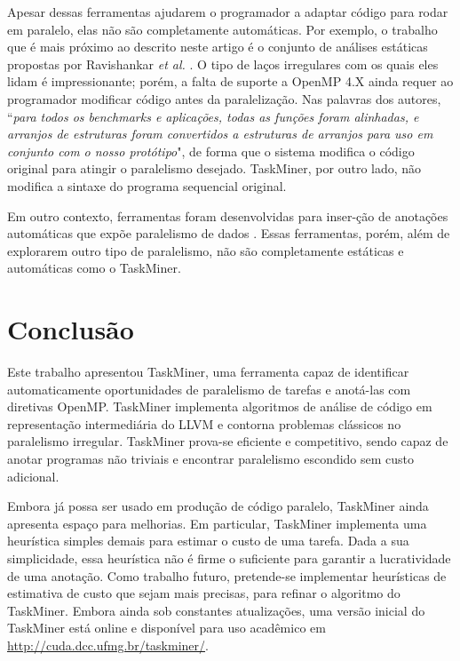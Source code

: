 \documentclass[sigconf]{acmart}
\newcommand\Taskminer{\mbox{\textsf{TaskMiner}}}
\begin{document}
Apesar dessas ferramentas ajudarem o programador a adaptar código para rodar em paralelo, elas não são completamente automáticas. Por exemplo, o trabalho que é mais próximo ao descrito neste artigo é o conjunto de análises estáticas propostas por Ravishankar {\em et al.} \cite{Ravishankar14}. O tipo de laços irregulares com os quais eles lidam é impressionante; porém, a falta de suporte a \textsf{OpenMP 4.X} ainda requer ao programador modificar código antes da paralelização. Nas palavras dos autores, ``{\em para todos os benchmarks e aplicações, todas as funções foram alinhadas, e arranjos de estruturas foram convertidos a estruturas de arranjos para uso em conjunto com o nosso protótipo}", de forma que o sistema modifica o código original para atingir o paralelismo desejado. \Taskminer{}, por outro lado, não modifica a sintaxe do programa sequencial original.

Em outro contexto, ferramentas foram desenvolvidas para inser-ção de anotações automáticas que expõe paralelismo de dados \cite{Wang2009}. Essas ferramentas, porém, além de explorarem outro tipo de paralelismo, não são completamente estáticas e automáticas como o \Taskminer{}.

\section{Conclus\~{a}o}
\label{sec:conc}

Este trabalho apresentou \Taskminer{}, uma ferramenta capaz de identificar automaticamente oportunidades de paralelismo de tarefas e anotá-las com diretivas OpenMP. \Taskminer{} implementa algoritmos de análise de código em representação intermediária do LLVM e contorna problemas clássicos no paralelismo irregular. \Taskminer{} prova-se eficiente e competitivo, sendo capaz de anotar programas não triviais e encontrar paralelismo escondido sem custo adicional. 

Embora já possa ser usado em produção de código paralelo, \Taskminer{} ainda apresenta espaço
para melhorias.
Em particular, \Taskminer{} implementa uma heurística simples demais para estimar o custo de uma tarefa.
Dada a sua simplicidade, essa heurística não é firme o suficiente para garantir a lucratividade de uma anotação. Como trabalho futuro, pretende-se implementar heurísticas de estimativa de custo que sejam mais precisas, para refinar o algoritmo do \Taskminer{}. Embora ainda sob constantes atualizações, uma versão inicial do
\Taskminer{} está online e disponível para uso acadêmico em \url{http://cuda.dcc.ufmg.br/taskminer/}.


\end{document}
